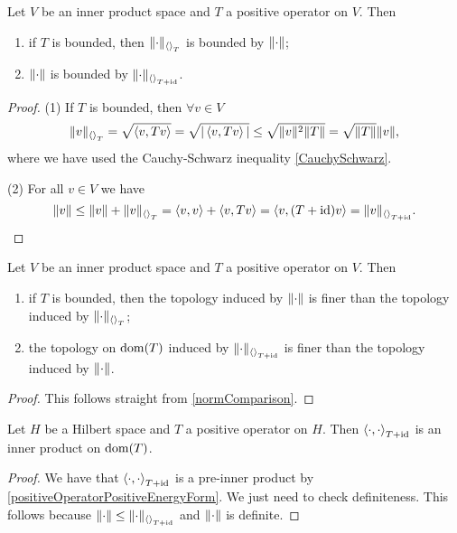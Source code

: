 \begin{proposition} \label{energyNormTopology}
Let $V$ be an inner product space and $T$ a positive operator on $V$. Then
\begin{enumerate}
\item if $T$ is bounded, then $\lVert\cdot\rVert_{\left\langle  \right\rangle_T}$ is bounded by $\lVert\cdot\rVert$;
\item $\lVert\cdot\rVert$ is bounded by $\lVert\cdot\rVert_{\left\langle  \right\rangle_{T+\operatorname{id}}}$.
\end{enumerate}
\end{proposition}
\begin{proof}
(1) If $T$ is bounded, then $\forall v\in V$
\[ \lVert v\rVert_{\left\langle  \right\rangle_T} = \sqrt{\left\langle v,Tv \right\rangle} = \sqrt{|\left\langle v,Tv \right\rangle|} \leq \sqrt{\lVert v\rVert^2\lVert T\rVert} = \sqrt{\lVert T\rVert}\lVert v\rVert, \]
where we have used the Cauchy-Schwarz inequality \ref{CauchySchwarz}.

(2) For all $v\in V$ we have
\[ \lVert v\rVert \leq \lVert v\rVert + \lVert v\rVert_{\left\langle  \right\rangle_T} = \left\langle v,v \right\rangle + \left\langle v,Tv \right\rangle = \left\langle v,(T+\operatorname{id})v \right\rangle = \lVert v\rVert_{\left\langle  \right\rangle_{T+\operatorname{id}}}. \]
\end{proof}
\begin{corollary}
Let $V$ be an inner product space and $T$ a positive operator on $V$. Then
\begin{enumerate}
\item if $T$ is bounded, then the topology induced by $\lVert\cdot\rVert$ is finer than the topology induced by $\lVert\cdot\rVert_{\left\langle  \right\rangle_T}$;
\item the topology on $\operatorname{dom}(T)$ induced by $\lVert\cdot\rVert_{\left\langle  \right\rangle_{T+\operatorname{id}}}$ is finer than the topology induced by $\lVert\cdot\rVert$.
\end{enumerate}
\end{corollary}
\begin{proof}
This follows straight from \ref{normComparison}.
\end{proof}
\begin{corollary}
Let $H$ be a Hilbert space and $T$ a positive operator on $H$. Then $\left\langle \cdot,\cdot \right\rangle_{T+\operatorname{id}}$ is an inner product on $\operatorname{dom}(T)$.
\end{corollary}
\begin{proof}
We have that $\left\langle \cdot,\cdot \right\rangle_{T+\operatorname{id}}$ is a pre-inner product by \ref{positiveOperatorPositiveEnergyForm}. We just need to check definiteness. This follows because $\lVert\cdot\rVert \leq \lVert\cdot\rVert_{\left\langle  \right\rangle_{T+\operatorname{id}}}$ and $\lVert\cdot\rVert$ is definite.
\end{proof}




